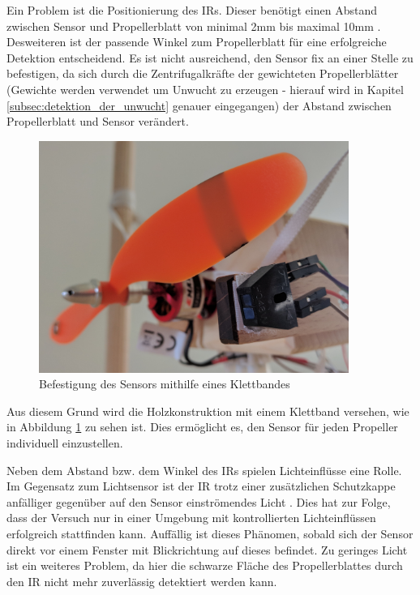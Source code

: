 Ein Problem ist die Positionierung des \ac{IR}s.
Dieser benötigt einen Abstand zwischen Sensor und Propellerblatt von minimal 2mm bis maximal 10mm \cite[Description]{sensor_ir_description}.
Desweiteren ist der passende Winkel zum Propellerblatt für eine erfolgreiche Detektion entscheidend.
Es ist nicht ausreichend, den Sensor fix an einer Stelle zu befestigen, da sich durch die Zentrifugalkräfte der gewichteten Propellerblätter (Gewichte werden verwendet um Unwucht zu erzeugen - hierauf wird in Kapitel \ref{subsec:detektion_der_unwucht} genauer eingegangen) der Abstand zwischen Propellerblatt und Sensor verändert.
\begin{figure}[H]
	\centering
	\includegraphics[width=0.9\textwidth]{images/chapter/03/exp_ir_sensor.jpg}
	\caption{Befestigung des Sensors mithilfe eines Klettbandes}
	\label{fig:exp_ir_sensor}
\end{figure}
Aus diesem Grund wird die Holzkonstruktion mit einem Klettband versehen, wie in Abbildung \ref{fig:exp_ir_sensor} zu sehen ist.
Dies ermöglicht es, den Sensor für jeden Propeller individuell einzustellen.

Neben dem Abstand bzw. dem Winkel des \ac{IR}s spielen Lichteinflüsse eine Rolle.
Im Gegensatz zum Lichtsensor ist der \ac{IR} trotz einer zusätzlichen Schutzkappe anfälliger gegenüber auf den Sensor einströmendes Licht \cite[Features]{ir_datasheet}.
Dies hat zur Folge, dass der Versuch nur in einer Umgebung mit kontrollierten Lichteinflüssen erfolgreich stattfinden kann.
Auffällig ist dieses Phänomen, sobald sich der Sensor direkt vor einem Fenster mit Blickrichtung auf dieses befindet.
Zu geringes Licht ist ein weiteres Problem, da hier die schwarze Fläche des Propellerblattes durch den \ac{IR} nicht mehr zuverlässig detektiert werden kann.

